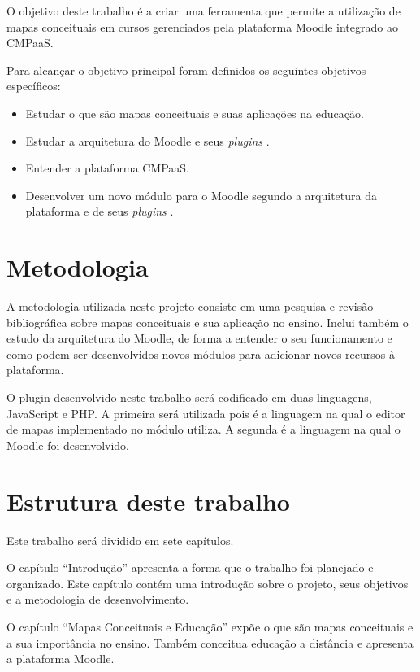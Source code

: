 \documentclass[
	12pt,				%
	openright,			%
	oneside,			%
	a4paper,			%
	english,			%
	french,				%
	spanish,			%
	brazil				%
	]{abntex2}
\begin{document}
O objetivo deste trabalho é a criar uma ferramenta que permite a utilização de mapas conceituais em cursos gerenciados pela plataforma Moodle integrado ao CMPaaS.

Para alcançar o objetivo principal foram definidos os seguintes objetivos específicos:

\begin{itemize}
	\item Estudar o que são mapas conceituais e suas aplicações na educação.
	\item Estudar a arquitetura do Moodle e seus \textit{plugins} .
	\item Entender a plataforma CMPaaS.
	\item Desenvolver um novo módulo para o Moodle segundo a arquitetura da plataforma e de seus \textit{plugins} .   
\end{itemize} 



\section{Metodologia}

A metodologia utilizada neste projeto consiste em uma pesquisa e revisão bibliográfica sobre mapas conceituais e sua aplicação no ensino. Inclui também o estudo da arquitetura do Moodle, de forma a entender o seu funcionamento e como podem ser desenvolvidos novos módulos para adicionar novos recursos à plataforma.

O plugin desenvolvido neste trabalho será codificado em duas linguagens, JavaScript e PHP. A primeira será utilizada pois é a linguagem na qual o editor de mapas implementado no módulo utiliza. A segunda é a linguagem na qual o Moodle foi desenvolvido.  

\section{Estrutura deste trabalho}

Este trabalho será dividido em sete capítulos.

O capítulo ``Introdução'' apresenta a forma que o trabalho foi planejado e organizado. Este capítulo contém uma introdução sobre o projeto, seus objetivos e a metodologia de desenvolvimento.

O capítulo ``Mapas Conceituais e Educação'' expõe o que são mapas conceituais e a sua importância no ensino. Também conceitua educação a distância e apresenta a plataforma Moodle.
\end{document}

